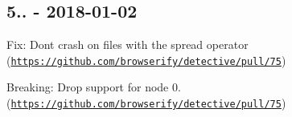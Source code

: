 \subsection*{5.. -\/ 2018-\/01-\/02}


\begin{DoxyItemize}
\item Fix\+: Don\textquotesingle{}t crash on files with the spread operator (\href{https://github.com/browserify/detective/pull/75}{\tt https\+://github.\+com/browserify/detective/pull/75})
\item Breaking\+: Drop support for node 0. (\href{https://github.com/browserify/detective/pull/75}{\tt https\+://github.\+com/browserify/detective/pull/75}) 
\end{DoxyItemize}